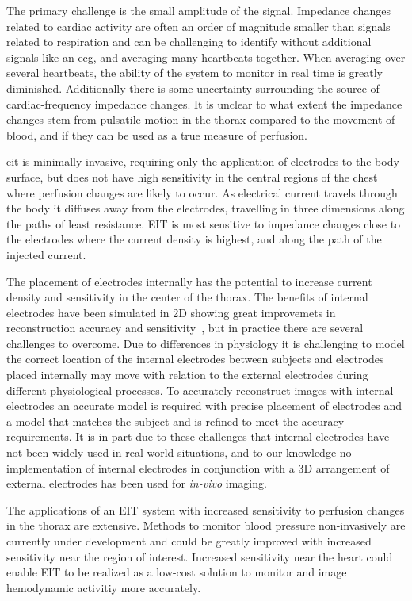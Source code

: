 The primary challenge is the small amplitude of the signal. 
Impedance changes related to cardiac activity are often an order of
magnitude smaller than signals related to respiration and can be challenging to identify without additional signals like 
an \acrfull{ecg}, and averaging many heartbeats together. When 
averaging over several heartbeats, the ability of the system to 
monitor in real time is greatly diminished. Additionally 
there is some uncertainty surrounding the source of
cardiac-frequency impedance changes. It is unclear to what 
extent the impedance changes stem from pulsatile
motion in the thorax compared to the movement of blood, 
and if they can be used as a true measure of perfusion. 

\acrshort{eit} is minimally invasive, requiring only 
the application of electrodes to the body surface, but 
does not have high sensitivity in the central regions 
of the chest where perfusion changes are likely to occur.
As electrical current travels through the body it diffuses away from 
the electrodes,
travelling in three dimensions along the paths of least resistance. 
EIT is most sensitive to impedance changes close to the electrodes
where the current density is highest, 
and along the path of the injected current.

The placement of electrodes internally has the 
potential to increase current density and sensitivity in 
the center of the thorax. 
The benefits of internal electrodes have been simulated 
in 2D showing great improvemets in reconstruction accuracy 
and sensitivity~\parencite{nasehi_tehrani_modelling_2012}, but 
in practice there are several challenges to overcome. 
Due to differences in physiology it is challenging to model
the correct location of the internal electrodes between subjects
and electrodes placed internally may move with relation 
to the external electrodes during different physiological
processes.  
To accurately reconstruct images with internal electrodes 
an accurate model is required with precise placement of electrodes
and a model that matches the subject and is refined 
to meet the accuracy requirements. 
It is in part due to these challenges that internal electrodes 
have not been widely used in real-world situations, and to our knowledge 
no implementation of internal electrodes in conjunction 
with a 3D arrangement of external electrodes has been used for \emph{in-vivo}
imaging.

The applications of an EIT system with increased sensitivity to perfusion changes
in the thorax are extensive. Methods to monitor blood pressure non-invasively are 
currently under development and could be greatly improved with increased sensitivity 
near the region of interest. Increased sensitivity near the heart 
could enable EIT to be realized as a low-cost solution to monitor and image
hemodynamic activitiy more accurately.  

